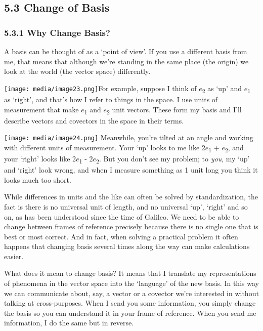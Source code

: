 \documentclass[oneside,english]{amsbook}
\numberwithin{section}{chapter}
\theoremstyle{plain}
\theoremstyle{definition}
\begin{document}
\subsection{5.3 Change of Basis}\label{change-of-basis}

\subsubsection{5.3.1 Why Change Basis?}\label{why-change-basis}

A basis can be thought of as a `point of view'. If you use a different
basis from me, that means that although we're standing in the same place
(the origin) we look at the world (the vector space) differently.

\texttt{[image: media/image23.png]}For
example, suppose I think of $e$\textsubscript{2} as `up' and
$e$\textsubscript{1} as `right', and that's how I refer to things
in the space. I use units of measurement that make
$e$\textsubscript{1} and $e$\textsubscript{2} unit vectors. These
form my basis and I'll describe vectors and covectors in the space in
their terms.

\texttt{[image: media/image24.png]}
Meanwhile, you're tilted at an angle and working with different units of
measurement. Your `up' looks to me like 2$e$\textsubscript{1} +
$e$\textsubscript{2}, and your `right' looks like
2$e$\textsubscript{1} - 2$e$\textsubscript{2}. But you don't see
my problem; to \emph{you}, my `up' and `right' look wrong, and when
I measure something as 1 unit long you think it looks much too short.

While differences in units and the like can often be solved by
standardization, the fact is there is no universal unit of length, and
no universal `up', `right' and so on, as has been understood since
the time of Galileo. We need to be able to change between frames of
reference precisely because there is no single one that is best or most
correct. And in fact, when solving a practical problem it often happens
that changing basis several times along the way can make calculations
easier.

What does it mean to change basis? It means that I translate my
representations of phenomena in the vector space into the `language'
of the new basis. In this way we can communicate about, say, a vector or
a covector we're interested in without talking at cross-purposes. When I
send you some information, you simply change the basis so you can
understand it in your frame of reference. When you send me information,
I do the same but in reverse.
\end{document}
